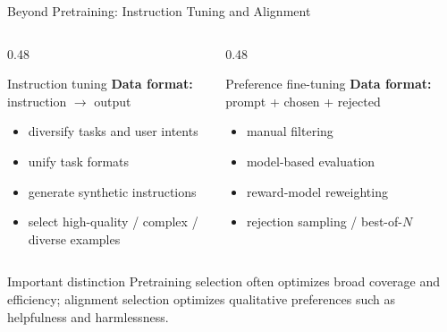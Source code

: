 \documentclass[aspectratio=169]{beamer}
\begin{document}
\begin{frame}{Beyond Pretraining: Instruction Tuning and Alignment}

\begin{columns}[T,totalwidth=\textwidth]

\begin{column}{0.48\textwidth}
\begin{block}{Instruction tuning}
\textbf{Data format:} instruction $\rightarrow$ output
\begin{itemize}
  \item diversify tasks and user intents
  \item unify task formats
  \item generate synthetic instructions
  \item select high-quality / complex / diverse examples
\end{itemize}
\end{block}
\end{column}

\begin{column}{0.48\textwidth}
\begin{block}{Preference fine-tuning}
\textbf{Data format:} prompt + chosen + rejected
\begin{itemize}
  \item manual filtering
  \item model-based evaluation
  \item reward-model reweighting
  \item rejection sampling / best-of-$N$
\end{itemize}
\end{block}
\end{column}

\end{columns}

\vspace{0.8em}

\begin{alertblock}{Important distinction}
Pretraining selection often optimizes broad coverage and efficiency; alignment selection optimizes qualitative preferences such as helpfulness and harmlessness.
\end{alertblock}

\end{frame}
\end{document}
